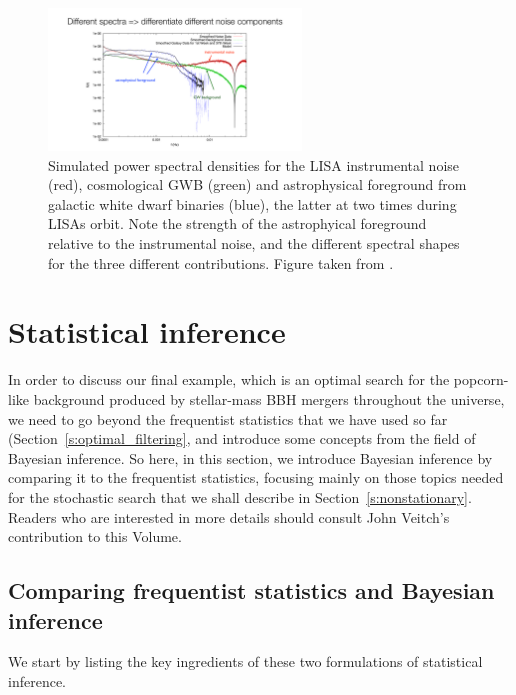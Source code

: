\begin{figure}[htbp!]

\begin{center}
\includegraphics[width=0.6\textwidth]{Figures/LISA_psds}
\caption{Simulated power spectral densities for the 
LISA instrumental noise (red), cosmological GWB (green)
and astrophysical foreground from galactic white dwarf
binaries (blue), the latter at two times during LISAs orbit.
Note the strength of the astrophyical foreground relative
to the instrumental noise, and the different spectral shapes
for the three different contributions.
Figure taken from \cite{Adams-Cornish:2014}.}
\label{f:LISA_psds}
\end{center}
\end{figure}

\section{Statistical inference}

In order to discuss our final example, which is an
optimal search for the popcorn-like background
produced by stellar-mass BBH mergers throughout the 
universe, we need to go beyond the frequentist 
statistics that we have used so far (Section~\ref{s:optimal_filtering}, 
and introduce some concepts from the field of Bayesian inference.
So here, in this section, we introduce Bayesian 
inference by comparing it to the frequentist 
statistics, focusing mainly on those topics needed for 
the stochastic search that we shall describe in
Section~\ref{s:nonstationary}.
Readers who are interested in more details should 
consult John Veitch's contribution to this Volume.

\subsection{Comparing frequentist statistics and Bayesian inference}

We start by listing the key ingredients of these two formulations 
of statistical inference.
\medskip

